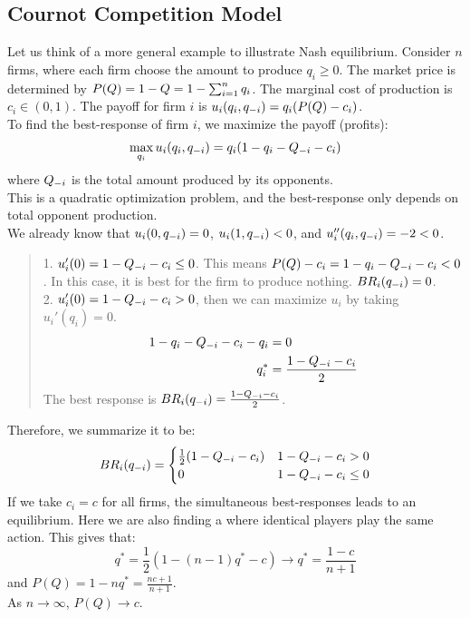 \subsection{Cournot Competition Model}
Let us think of a more general example to illustrate Nash equilibrium. Consider $n$ firms, where each firm choose the amount to produce $q_i \ge 0$. The market price is determined by $P(Q) = 1 - Q = 1 - \sum_{i = 1}^{n}q_i$. The marginal cost of production is $c_i \in (0, 1)$. The payoff for firm $i$ is $u_i(q_i, q_{-i}) = q_i(P(Q) - c_i)$. \\
To find the best-response of firm $i$, we maximize the payoff (profits):
$$\max_{q_i} u_i(q_i, q_{-i}) = q_i(1 - q_i - Q_{-i} - c_i)$$
where $Q_{-i}$ is the total amount produced by its opponents. \\
This is a quadratic optimization problem, and the best-response only depends on total opponent production. \\
We already know that $u_i(0, q_{-i}) = 0$, $u_i(1, q_{-i}) < 0$, and $u_i''(q_i, q_{-i}) = -2 < 0$.
\begin{quote}
    1. $u_i'(0) = 1 - Q_{-i} - c_i \le 0$. This means $P(Q) - c_i = 1 - q_i - Q_{-i} - c_i < 0$. In this case, it is best for the firm to produce nothing. $BR_i(q_{-i}) = 0$. \\
    2. $u_i'(0) = 1 - Q_{-i} - c_i > 0$, then we can maximize $u_i$ by taking $u_i'(q_i) = 0$.
    \begin{align*}
        1 - q_i - Q_{-i} - c_i - q_i &= 0 \\
        q_i^* &= \frac{1 - Q_{-i} - c_i}{2}
    \end{align*}
    The best response is $BR_i(q_{-i}) = \frac{1 - Q_{-i} - c_i}{2}$.
\end{quote}
Therefore, we summarize it to be:
$$BR_i(q_{-i}) = \begin{cases}
    \frac{1}{2}(1 - Q_{-i} - c_i) & 1 - Q_{-i} - c_i > 0 \\
    0 & 1 - Q_{-i} - c_i \le 0
\end{cases}$$
If we take $c_i = c$ for all firms, the simultaneous best-responses leads to an equilibrium. Here we are also finding a  where identical players play the same action. This gives that:
$$q^* = \frac{1}{2}(1 - (n-1)q^* - c) \to q^* = \frac{1 - c}{n + 1}$$
and $P(Q) = 1 - nq^* = \frac{nc+1}{n+1}$. \\
As $n \to \infty$, $P(Q) \to c$.

